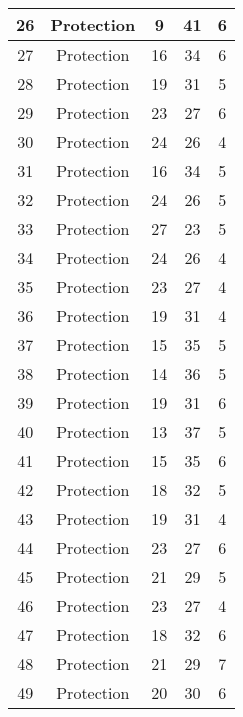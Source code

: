 \documentclass[results.tex]{subfiles}
\begin{document}
\begin{center}
\begin{tabular}{| c || c | c | c | c |}
    \hline
    26 & Protection & 9 & 41 & 6 \\ 
    \hline
    27 & Protection & 16 & 34 & 6 \\ 
    \hline
    28 & Protection & 19 & 31 & 5 \\ 
    \hline
    29 & Protection & 23 & 27 & 6 \\ 
    \hline
    30 & Protection & 24 & 26 & 4 \\ 
    \hline
    31 & Protection & 16 & 34 & 5 \\ 
    \hline
    32 & Protection & 24 & 26 & 5 \\ 
    \hline
    33 & Protection & 27 & 23 & 5 \\ 
    \hline
    34 & Protection & 24 & 26 & 4 \\ 
    \hline
    35 & Protection & 23 & 27 & 4 \\ 
    \hline
    36 & Protection & 19 & 31 & 4 \\ 
    \hline
    37 & Protection & 15 & 35 & 5 \\ 
    \hline
    38 & Protection & 14 & 36 & 5 \\ 
    \hline
    39 & Protection & 19 & 31 & 6 \\ 
    \hline
    40 & Protection & 13 & 37 & 5 \\ 
    \hline
    41 & Protection & 15 & 35 & 6 \\ 
    \hline
    42 & Protection & 18 & 32 & 5 \\ 
    \hline
    43 & Protection & 19 & 31 & 4 \\ 
    \hline
    44 & Protection & 23 & 27 & 6 \\ 
    \hline
    45 & Protection & 21 & 29 & 5 \\ 
    \hline
    46 & Protection & 23 & 27 & 4 \\ 
    \hline
    47 & Protection & 18 & 32 & 6 \\ 
    \hline
    48 & Protection & 21 & 29 & 7 \\ 
    \hline
    49 & Protection & 20 & 30 & 6 \\ 
    \hline   \end{tabular}
\end{center}
\end{document}
